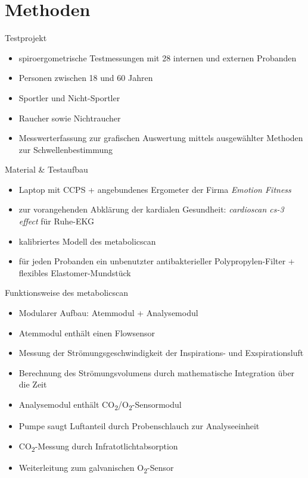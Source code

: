 \documentclass[colorBG,slideColor,9pt]{beamer}
\begin{document}
\section{Methoden}

\begin{frame}{Testprojekt}
\begin{itemize}
	\item spiroergometrische Testmessungen mit 28 internen und externen Probanden
	\item Personen zwischen 18 und 60 Jahren
	\item Sportler und Nicht-Sportler
	\item Raucher sowie Nichtraucher
	\item Messwerterfassung zur grafischen Auswertung mittels ausgewählter Methoden zur Schwellenbestimmung
\end{itemize}
\end{frame}

\begin{frame}{Material \& Testaufbau}
\begin{itemize}
	\item Laptop mit CCPS + angebundenes Ergometer der Firma \textsl{Emotion Fitness}
	\item zur vorangehenden Abklärung der kardialen Gesundheit: \textsl{cardioscan cs-3 effect} für Ruhe-EKG
	\item kalibriertes Modell des metabolicscan
	\item für jeden Probanden ein unbenutzter antibakterieller Polypropylen-Filter + flexibles Elastomer-Mundstück
\end{itemize}
\end{frame}

\begin{frame}{Funktionsweise des metabolicscan}
\begin{itemize}
	\item Modularer Aufbau: Atemmodul + Analysemodul
	\item Atemmodul enthält einen Flowsensor
	\item Messung der Strömungsgeschwindigkeit der Inspirations- und Exspirationsluft
	\item Berechnung des Strömungsvolumens durch mathematische Integration über die Zeit
	\item Analysemodul enthält CO\textsubscript{2}/O\textsubscript{2}-Sensormodul
	\item Pumpe saugt Luftanteil durch Probenschlauch zur Analyseeinheit
	\item CO\textsubscript{2}-Messung durch Infratotlichtabsorption
	\item Weiterleitung zum galvanischen O\textsubscript{2}-Sensor
\end{itemize}
\end{frame}
\end{document}
